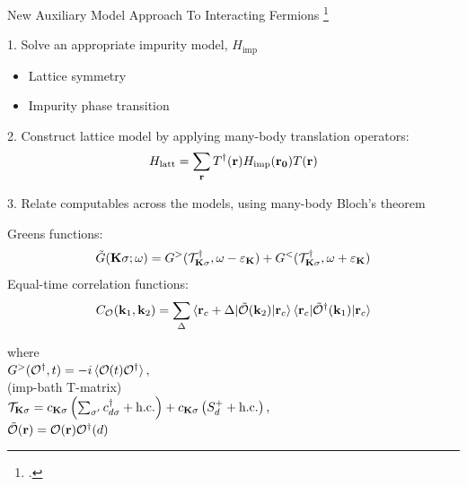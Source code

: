 \documentclass[10pt,aspectratio=169]{beamer}
\begin{document}
\begin{frame}{New Auxiliary Model Approach To Interacting Fermions}
	\footcite{stoyanova,Maier2005,Sakai2023}
	\begin{minipage}{0.4\textwidth}
		1. Solve an appropriate \alert{impurity model}, \(H_\text{imp}\)
	\begin{itemize}
		\item Lattice symmetry
		\item Impurity phase transition
	\end{itemize}
	\end{minipage}
	\hfill
	\begin{minipage}{0.48\textwidth}
		2. \alert{Construct lattice} model by applying many-body translation operators:
	\[ H_\text{latt} = \sum_{\bf r} T^\dagger({\bf r}) H_\text{imp}({\bf r_0})T({\bf r})\]
	\end{minipage}

	\vfill
	3. Relate computables across the models, using many-body Bloch's theorem\\[5pt]
	\begin{minipage}{0.55\textwidth}
	\alert{Greens functions}: \\
	\[\tilde G({\bf K}\sigma; \omega) = G^>(\mathcal{T}^\dagger_{{\bf K}\sigma}, \omega - \varepsilon_{{\bf K}}) + G^<(\mathcal{T}^\dagger_{{\bf K}\sigma}, \omega + \varepsilon_{{\bf K}})\]
	Equal-time \alert{correlation} functions:
	\[C_{\mathcal{O}}({\bf k}_1,{\bf k}_2) = \sum_{{\Delta}}\braket{{\bf r}_c + {\Delta} | \mathcal{\tilde O}({\bf k}_2) | {\bf r}_c}\braket{{\bf r}_c | \mathcal{\tilde O}^\dagger({\bf k}_1) | {\bf r}_c}\]
	\end{minipage}
	\hfill
	\begin{minipage}{0.43\textwidth}
		where \\[5pt]
		\(G^>(\mathcal{O}^\dagger, t) = -i\braket{\mathcal{O}(t)\mathcal{O}^\dagger},\)\\[10pt]
		(imp-bath T-matrix)\\[2pt]
		\(\mathcal{T}_{{\bf K}\sigma} = c_{{\bf K}\sigma}\left(\sum_{\sigma^\prime}c^\dagger_{d\sigma} + \text{h.c.}\right) + c_{{\bf K}\sigma}\left(S_d^+ + \text{h.c.}\right),\)\\[10pt]
		\(\mathcal{\tilde O}({\bf r}) = \mathcal{O}({\bf r})\mathcal{O}^\dagger(d)\)
	\end{minipage}
	
	
	
\end{frame}
\end{document}
